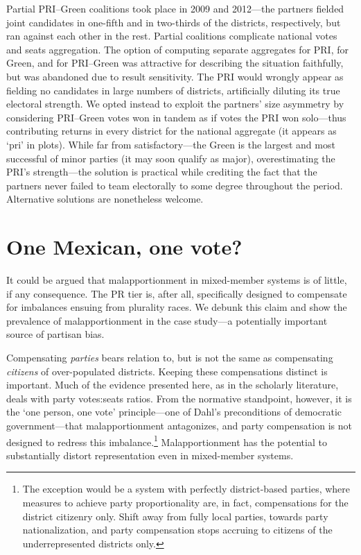 \documentclass[letter,12pt]{article}
\begin{document}
Partial PRI--Green coalitions took place in 2009 and 2012---the partners fielded joint candidates in one-fifth and in two-thirds of the districts, respectively, but ran against each other in the rest. Partial coalitions complicate national votes and seats aggregation. The option of computing separate aggregates for PRI, for Green, and for PRI--Green was attractive for describing the situation faithfully, but was abandoned due to result sensitivity. The PRI would wrongly appear as fielding no candidates in large numbers of districts, artificially diluting its true electoral strength. We opted instead to exploit the partners' size asymmetry by considering PRI--Green votes won in tandem as if votes the PRI won solo---thus contributing returns in every district for the national aggregate (it appears as `pri' in plots). While far from satisfactory---the Green is the largest and most successful of minor parties (it may soon qualify as major), overestimating the PRI's strength---the solution is practical while crediting the fact that the partners never failed to team electorally to some degree throughout the period. Alternative solutions are nonetheless welcome. 






\section{One Mexican, one vote?}


It could be argued that malapportionment in mixed-member systems is of little, if any consequence. The PR tier is, after all, specifically designed to compensate for imbalances ensuing from plurality races. We debunk this claim and show the prevalence of malapportionment in the case study---a potentially important source of partisan bias. 

Compensating \emph{parties} bears relation to, but is not the same as compensating \emph{citizens} of over-populated districts. Keeping these compensations distinct is important. Much of the evidence presented here, as in the scholarly literature, deals with party votes:seats ratios. From the normative standpoint, however, it is the `one person, one vote' principle---one of Dahl's \citeyearpar{dahl.1972} preconditions of democratic government---that malapportionment antagonizes, and party compensation is not designed to redress this imbalance.\footnote{The exception would be a system with perfectly district-based parties, where measures to achieve party proportionality are, in fact, compensations for the district citizenry only. Shift away from fully local parties, towards party nationalization, and party compensation stops accruing to citizens of the underrepresented districts only.} Malapportionment has the potential to substantially distort representation even in mixed-member systems. 
\end{document}
